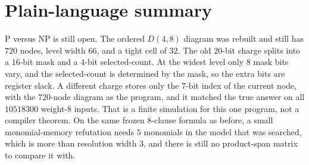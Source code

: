 \documentclass[11pt]{article}
\begin{document}
\section*{Plain-language summary}
P versus NP is still open.
The ordered \(D(4,8)\) diagram was rebuilt and still has \(720\) nodes, level width \(66\), and a tight cell of \(32\).
The old \(20\)-bit charge splits into a \(16\)-bit mask and a \(4\)-bit selected-count.
At the widest level only \(8\) mask bits vary, and the selected-count is determined by the mask, so the extra bits are register slack.
A different charge stores only the \(7\)-bit index of the current node, with the \(720\)-node diagram as the program, and it matched the true answer on all \(10518300\) weight-\(8\) inputs.
That is a finite simulation for this one program, not a compiler theorem.
On the same frozen \(8\)-clause formula as before, a small monomial-memory refutation needs \(5\) monomials in the model that was searched, which is more than resolution width \(3\), and there is still no product-span matrix to compare it with.

\end{document}

